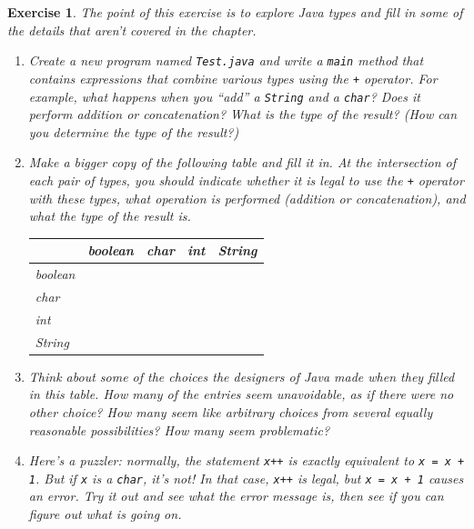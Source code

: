 \documentclass[12pt]{book}
\theoremstyle{exercise}
\newtheorem{exercise}{Exercise}[chapter]
\begin{document}
\begin{exercise}

The point of this exercise is to explore Java types
and fill in some of the details that aren't covered
in the chapter.

\begin{enumerate}

\item Create a new program named {\tt Test.java} and write
a {\tt main} method that contains
expressions that combine
various types using the {\tt +} operator.  For example, what
happens when you ``add'' a {\tt String} and a {\tt char}?
Does it perform addition or concatenation?   What is the type
of the result? (How can you determine the type of the result?)

\item Make a bigger copy of the following table and fill it in.  At the
intersection of each pair of types, you should indicate whether it is
legal to use the {\tt +} operator with these types, what operation is
performed (addition or concatenation), and what the type of the result
is.

\begin{tabular}{|l|l|l|l|l|} \hline
        &  boolean  &  char  &  int  &  String \\ \hline
boolean &           &        &       &         \\ \hline
char    &           &        &       &         \\ \hline
int     &           &        &       &         \\ \hline
String  &           &        &       &         \\ \hline
\end{tabular}

\item Think about some of the choices the designers of Java
made when they filled in this table.  How many of the entries
seem unavoidable, as if there were no other choice?
How many seem like arbitrary choices from several equally
reasonable possibilities?  How many seem problematic?

\item Here's a puzzler: normally, the statement {\tt x++} is exactly
  equivalent to {\tt x = x + 1}.  But if {\tt x} is a {\tt char}, it's
  not!  In that case, {\tt x++} is legal, but {\tt x = x + 1} causes
  an error.  Try it out and see what the error message is, then see if
  you can figure out what is going on.

\end{enumerate}
\end{exercise}
\end{document}

